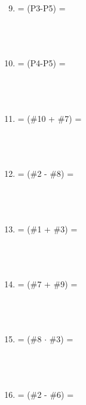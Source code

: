 \documentclass[12pt]{article}
\begin{document}
\begin{minipage}[t]{0.6\textwidth}
    \begin{enumerate}[\#1]
        \setcounter{enumi}{8} %
        \item = (P3-P5) =
        \\\\\\\\
        \item = (P4-P5) =
        \\\\\\\\
        \item = (\#10 + \#7) = 
        \\\\\\\\
        \item = (\#2 - \#8) = 
        \\\\\\\\
        \item = (\#1 + \#3) = 
        \\\\\\\\
        \item = (\#7 + \#9) =
        \\\\\\\\
        \item = (\#8 $\cdot$ \#3) = 
        \\\\\\\\
        \item = (\#2 - \#6) = 

    \end{enumerate}
\end{minipage}
\end{document}
